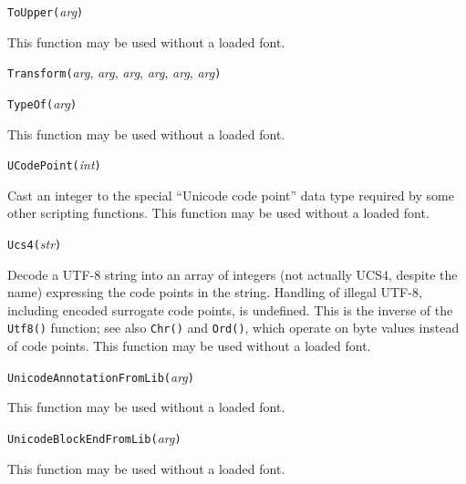 \texttt{ToUpper(}\textit{arg}\texttt{)}

This function may be used without a loaded font.



\texttt{Transform(}\textit{arg}, \textit{arg}, \textit{arg}, \textit{arg}, \textit{arg}, \textit{arg}\texttt{)}



\texttt{TypeOf(}\textit{arg}\texttt{)}

This function may be used without a loaded font.



\texttt{UCodePoint(}\textit{int}\texttt{)}

Cast an integer to the special ``Unicode code point'' data type required by
some other scripting functions.  This function may be used without a loaded
font.



\texttt{Ucs4(}\textit{str}\texttt{)}

Decode a UTF-8 string into an array of integers (not actually UCS4, despite
the name) expressing the code points
in the string.  Handling of illegal UTF-8, including encoded surrogate code
points, is undefined.  This is the inverse of the \texttt{Utf8()} function;
see also \texttt{Chr()} and \texttt{Ord()}, which operate on byte values
instead of code points.  This function may be used without a loaded font.



\texttt{UnicodeAnnotationFromLib(}\textit{arg}\texttt{)}

This function may be used without a loaded font.



\texttt{UnicodeBlockEndFromLib(}\textit{arg}\texttt{)}

This function may be used without a loaded font.


